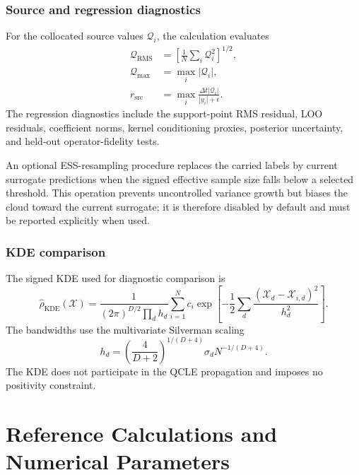 \documentclass[
  11pt,
  letterpaper,
  onehalfspacing,
  normalmargins,
  equalmargins,
  oneside
]{ut-thesis}
\begin{document}
\subsection{Source and regression diagnostics}
\label{appsubsec:source-regression-diagnostics}

For the collocated source values \(\mathcal Q_i\), the calculation evaluates
\begin{align}
\mathcal Q_{\mathrm{RMS}}
&=
\left[
\frac{1}{N}
\sum_i\mathcal Q_i^2
\right]^{1/2},
\\
\mathcal Q_{\max}
&=
\max_i|\mathcal Q_i|,
\\
r_{\mathrm{src}}
&=
\max_i
\frac{
\Delta t|\mathcal Q_i|
}{
|y_i|+\epsilon
}.
\label{appeq:q-diagnostics}
\end{align}
The regression diagnostics include the support-point RMS residual, LOO
residuals, coefficient norms, kernel conditioning proxies, posterior
uncertainty, and held-out operator-fidelity tests.

An optional ESS-resampling procedure replaces the carried labels by current
surrogate predictions when the signed effective sample size falls below a
selected threshold.  This operation prevents uncontrolled variance growth but
biases the cloud toward the current surrogate; it is therefore disabled by
default and must be reported explicitly when used.

\subsection{KDE comparison}
\label{appsubsec:kde-comparison}

The signed KDE used for diagnostic comparison is
\begin{equation}
\widehat{\rho}_{\mathrm{KDE}}
(\boldsymbol{\mathcal X})
=
\frac{
1
}{
(2\pi)^{D/2}
\prod_d h_d
}
\sum_{i=1}^{N}
c_i
\exp\left[
-\frac{1}{2}
\sum_d
\frac{
(\mathcal X_d-\mathcal X_{i,d})^2
}{
h_d^2
}
\right].
\label{appeq:signed-kde}
\end{equation}
The bandwidths use the multivariate Silverman scaling
\cite{Silverman1986}
\begin{equation}
h_d
=
\left(
\frac{4}{D+2}
\right)^{1/(D+4)}
\sigma_d
N^{-1/(D+4)}.
\label{appeq:kde-bandwidth}
\end{equation}
The KDE does not participate in the QCLE propagation and imposes no positivity
constraint.

\chapter[Reference Calculations]{Reference Calculations and Numerical Parameters}
\label{app:reference-and-reproducibility}
\end{document}
